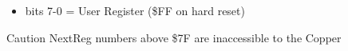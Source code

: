 \begin{itemize}
\item bits 7-0 = User Register (\$FF on hard reset)
\end{itemize}

Caution NextReg numbers above \$7F are inaccessible to the Copper

